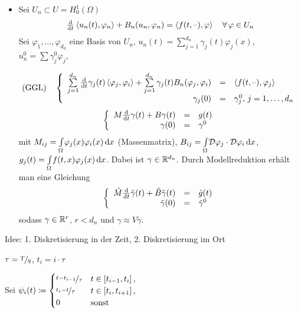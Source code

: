 \documentclass{cheat-sheet}
\newcommand{\IntOmega}[2]{\AInt{\Omega}{#1}{#2}} %
\newcommand{\DO}{\mathcal{D}} %
\newcommand{\scp}[2]{\left\langle #1 , #2 \right\rangle} %
\begin{document}
\begin{itemize}
  \item Sei $U_n \subset U = H_0^1(\Omega)$
  \[
    \tfrac{\d}{\d t} \scp{u_n(t)}{\varphi_n} + B_n(u_n, \varphi_n) = \scp{f(t, \blank)}{\varphi} \quad \forall \, \varphi \in U_n
  \]
  Sei $\varphi_1, \ldots, \varphi_{d_n}$ eine Basis von $U_n$, $u_n(t) = \sum_{j=1}^{d_n} \gamma_j(t) \varphi_j(x)$, $u_n^0 = \sum \gamma_j^0 \varphi_j$,
  
  \[
    \text{(GGL)} \quad
    \left\{ \begin{array}{rcl}
      \sum_{j=1}^{d_n} \tfrac{\d}{\d t} \gamma_j(t) \scp{\varphi_j}{\varphi_i} + \sum_{j=1}^{d_n} \gamma_j(t) B_n(\varphi_j, \varphi_i) &=& \scp{f(t, \blank)}{\varphi_j} \\
      \gamma_j(0) &=& \gamma_j^0, \, j = 1, \ldots, d_n
    \end{array} \right.
  \]
  \[
    \left\{ \begin{array}{rcl}
      M \tfrac{\mathrm{d}}{\mathrm{d} t} \gamma(t) + B \gamma(t) &=& g(t) \\
      \gamma(0) &=& \gamma^0
    \end{array} \right.
  \]
  mit $M_{ij} = \IntOmega{\varphi_j(x) \varphi_i(x)}{x}$ (Massenmatrix), $B_{ij} = \IntOmega{\DO \varphi_j \cdot \DO \varphi_i}{x}$, $g_j(t) = \IntOmega{f(t, x) \varphi_j(x)}{x}$.
  Dabei ist $\gamma \in \mathbb{R}^{d_n}$.
  Durch Modellreduktion erhält man eine Gleichung
  \[
    \left\{ \begin{array}{rcl}
      \tilde{M} \tfrac{\mathrm{d}}{\mathrm{d} t} \tilde{\gamma}(t) + \tilde{B} \tilde{\gamma}(t) &=& \tilde{g}(t) \\
      \tilde{\gamma}(0) &=& \tilde{\gamma}^0
    \end{array} \right.
  \]
  sodass $\gamma \in \mathbb{R}^r$, $r < d_n$ und $\gamma \approx V \tilde{\gamma}$.
\end{itemize}


Idee: 1. Diskretisierung in der Zeit, 2. Diskretisierung im Ort

$\tau = \nicefrac{T}{q}$, $t_i = i \cdot \tau$

Sei $\psi_i (t) \coloneqq \begin{cases}
  \nicefrac{t - t_{i-1}}{\tau} & t \in \left[ t_{i-1}, t_i \right], \\
  \nicefrac{t_i - t}{\tau} & t \in \left[ t_i, t_{i+1} \right], \\
  0 & \text{sonst}
\end{cases}$
\end{document}
